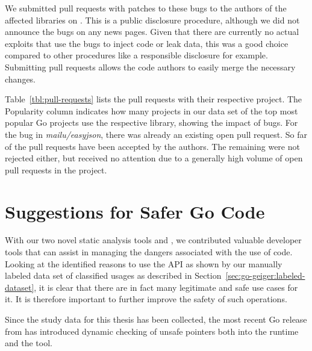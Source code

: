 We submitted \numberPRs{} pull requests with patches to these bugs to the authors of the affected libraries on
\github{}.
This is a public disclosure procedure, although we did not announce the bugs on any news pages.
Given that there are currently no actual exploits that use the bugs to inject code or leak data, this was a good choice
compared to other procedures like a responsible disclosure for example.
Submitting \github{} pull requests allows the code authors to easily merge the necessary changes.



Table~\ref{tbl:pull-requests} lists the pull requests with their respective \github{} project.
The Popularity column indicates how many projects in our data set of the top \projsTotal{} most popular Go projects use
the respective library, showing the impact of bugs.
For the bug in \textit{mailu/easyjson}, there was already an existing open pull request.
So far \numberPRsMerged{} of the pull requests have been accepted by the authors.
The remaining were not rejected either, but received no attention due to a generally high volume of open pull requests
in the project.



\section{Suggestions for Safer Go Code}\label{sec:discussion:safer-go-code}

With our two novel static analysis tools \toolGeiger{} and \toolSafer{}, we contributed valuable developer tools that
can assist in managing the dangers associated with the use of \unsafe{} code.
Looking at the identified reasons to use the \unsafe{} API as shown by our manually labeled data set of classified
usages as described in Section~\ref{sec:go-geiger:labeled-dataset}, it is clear that there are in fact many legitimate
and safe use cases for it.
It is therefore important to further improve the safety of such operations.

Since the study data for this thesis has been collected, the most recent Go release  from
 has introduced dynamic checking of unsafe pointers both into the runtime and the \toolVet{} tool.



